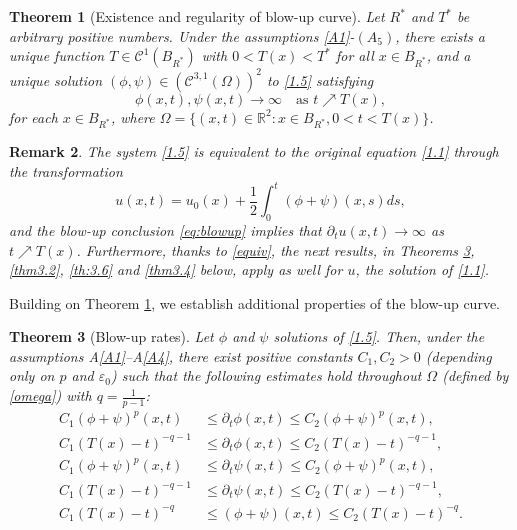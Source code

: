 \documentclass[
  sn-mathphys-num,
  colorlinks,
  linkcolor=darkmagenta,
  citecolor=rufous,
  urlcolor=zaffre,
  hypertexnames=false
]{sn-jnl}
\numberwithin{equation}{section}
\newtheorem{theorem}{Theorem}[section]%
\newtheorem{remark}[theorem]{Remark}%
\begin{document}
\begin{theorem}[Existence and regularity of blow-up curve]
\label{thm31}
Let $R^*$ and $T^*$ be arbitrary positive numbers. Under the assumptions \ref{A1}-$(A_5)$, there exists a unique function $T \in \mathcal{C}^1(B_{R^*})$ with $0 < T(x) < T^*$ for all $x \in B_{R^*}$, and a unique solution $(\phi, \psi) \in (\mathcal{C}^{3,1}(\Omega))^2$ to \eqref{1.5} satisfying
\begin{equation}
\phi(x,t), \psi(x,t) \to \infty \quad \text{as } t \nearrow T(x),
\label{eq:blowup}
\end{equation}
for each $x \in B_{R^*}$, where $\Omega = \{(x,t) \in \mathbb{R}^2 : x \in B_{R^*}, 0 < t < T(x)\}$.
\end{theorem}

\begin{remark}
\rm The system \eqref{1.5} is equivalent to the original equation \eqref{1.1} through the transformation
\begin{equation}
    \label{equiv}
u(x,t) = u_0(x) + \frac{1}{2}\int_0^t (\phi + \psi)(x,s) ds,
\end{equation}
and the blow-up conclusion \eqref{eq:blowup} implies that $\partial_t u(x,t) \to \infty$ as $t \nearrow T(x)$. Furthermore, thanks to \eqref{equiv}, the next results, in Theorems \ref{thm3.3}, \ref{thm3.2},  \ref{th:3.6} and \ref{thm3.4} below, apply as well for $u$, the solution of \eqref{1.1}.
\end{remark}

Building on Theorem \ref{thm31}, we establish additional properties of the blow-up curve.
\begin{theorem}[Blow-up rates]
\label{thm3.3}
Let $\phi$ and $\psi$ solutions of \eqref{1.5}. Then, under the assumptions A\ref{A1}--A\ref{A4}, there exist positive constants $C_1, C_2 > 0$ (depending only on $p$ and $\varepsilon_0$) such that the following estimates hold throughout $\Omega$ (defined by \eqref{omega}) with $q = \frac{1}{p-1}$:
\begin{align}
C_1 (\phi + \psi)^p(x,t) &\leq \partial_t \phi(x,t) \leq C_2 (\phi + \psi)^p(x,t), \label{aa} \\
C_1 (T(x) - t)^{-q-1} &\leq \partial_t \phi(x,t) \leq C_2 (T(x) - t)^{-q-1}, \label{bb} \\
C_1 (\phi + \psi)^p(x,t) &\leq \partial_t \psi(x,t) \leq C_2 (\phi + \psi)^p(x,t), \label{cc} \\
C_1 (T(x) - t)^{-q-1} &\leq \partial_t \psi(x,t) \leq C_2 (T(x) - t)^{-q-1}, \label{dd} \\
C_1 (T(x) - t)^{-q} &\leq (\phi + \psi)(x,t) \leq C_2 (T(x) - t)^{-q}. \label{ee}
\end{align}
\end{theorem}
\end{document}
